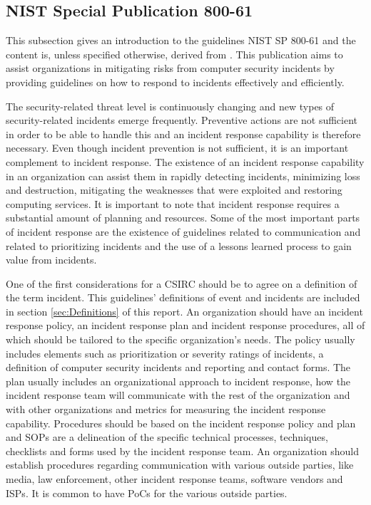 \subsection{\acs{NIST} Special Publication 800-61}
This subsection gives an introduction to the guidelines \acs{NIST} SP 800-61 and the content is, unless specified otherwise, derived from \cite{nist800-61}. This publication aims to  assist organizations in mitigating risks from computer security incidents by providing guidelines on how to respond to incidents effectively and efficiently. 

The security-related threat level is continuously changing and new types of security-related incidents emerge frequently. Preventive actions are not sufficient in order to be able to handle this and an incident response capability is therefore necessary. Even though incident prevention is not sufficient, it is an important complement to incident response. The existence of an incident response capability in an organization can assist them in rapidly detecting incidents, minimizing loss and destruction, mitigating the weaknesses that were exploited and restoring computing services. It is important to note that incident response requires a substantial amount of planning and resources. Some of the most important parts of incident response are the existence of guidelines related to communication and related to prioritizing incidents and the use of a lessons learned process to gain value from incidents.

One of the first considerations for a \ac{CSIRC} should be to agree on a definition of the term incident. This guidelines' definitions of event and incidents are included in section \ref{sec:Definitions} of this report. An organization should have an incident response policy, an incident response plan and incident response procedures, all of which should be tailored to the specific organization's needs. The policy usually includes elements such as prioritization or severity ratings of incidents, a definition of computer security incidents and reporting and contact forms. The plan usually includes an organizational approach to incident response, how the incident response team will communicate with the rest of the organization and with other organizations and metrics for measuring the incident response capability. Procedures should be based on the incident response policy and plan and \acp{SOP} are a delineation of the specific technical processes, techniques, checklists and forms used by the incident response team. An organization should establish procedures regarding communication with various outside parties, like media, law enforcement, other incident response teams, software vendors and \acp{ISP}. It is common to have \acp{PoC} for the various outside parties. 

